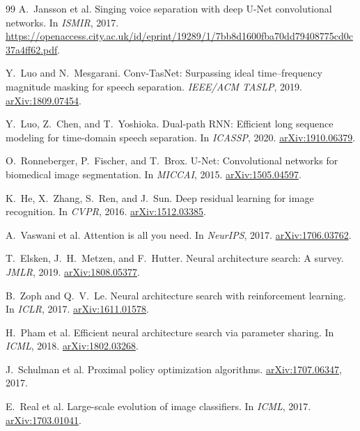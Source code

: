 \documentclass[10pt,twocolumn,letterpaper]{article}
\theoremstyle{remark}
\begin{document}
{\begin{thebibliography}{99}
A.~Jansson et al.
\newblock Singing voice separation with deep U-Net convolutional networks.
\newblock In \emph{ISMIR}, 2017.
\newblock \url{https://openaccess.city.ac.uk/id/eprint/19289/1/7bb8d1600fba70dd79408775cd0c37a4ff62.pdf}.

Y.~Luo and N.~Mesgarani.
\newblock Conv-TasNet: Surpassing ideal time--frequency magnitude masking for speech separation.
\newblock \emph{IEEE/ACM TASLP}, 2019.
\newblock \href{https://arxiv.org/abs/1809.07454}{arXiv:1809.07454}.

Y.~Luo, Z.~Chen, and T.~Yoshioka.
\newblock Dual-path RNN: Efficient long sequence modeling for time-domain speech separation.
\newblock In \emph{ICASSP}, 2020.
\newblock \href{https://arxiv.org/abs/1910.06379}{arXiv:1910.06379}.

O.~Ronneberger, P.~Fischer, and T.~Brox.
\newblock U-Net: Convolutional networks for biomedical image segmentation.
\newblock In \emph{MICCAI}, 2015.
\newblock \href{https://arxiv.org/abs/1505.04597}{arXiv:1505.04597}.

K.~He, X.~Zhang, S.~Ren, and J.~Sun.
\newblock Deep residual learning for image recognition.
\newblock In \emph{CVPR}, 2016.
\newblock \href{https://arxiv.org/abs/1512.03385}{arXiv:1512.03385}.

A.~Vaswani et al.
\newblock Attention is all you need.
\newblock In \emph{NeurIPS}, 2017.
\newblock \href{https://arxiv.org/abs/1706.03762}{arXiv:1706.03762}.

T.~Elsken, J.~H.~Metzen, and F.~Hutter.
\newblock Neural architecture search: A survey.
\newblock \emph{JMLR}, 2019.
\newblock \href{https://arxiv.org/abs/1808.05377}{arXiv:1808.05377}.

B.~Zoph and Q.~V.~Le.
\newblock Neural architecture search with reinforcement learning.
\newblock In \emph{ICLR}, 2017.
\newblock \href{https://arxiv.org/abs/1611.01578}{arXiv:1611.01578}.

H.~Pham et al.
\newblock Efficient neural architecture search via parameter sharing.
\newblock In \emph{ICML}, 2018.
\newblock \href{https://arxiv.org/abs/1802.03268}{arXiv:1802.03268}.

J.~Schulman et al.
\newblock Proximal policy optimization algorithms.
\newblock \href{https://arxiv.org/abs/1707.06347}{arXiv:1707.06347}, 2017.

E.~Real et al.
\newblock Large-scale evolution of image classifiers.
\newblock In \emph{ICML}, 2017.
\newblock \href{https://arxiv.org/abs/1703.01041}{arXiv:1703.01041}.


\end{thebibliography}}
\end{document}
